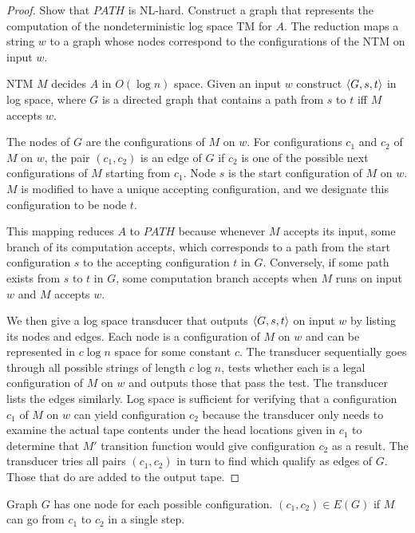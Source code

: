 \begin{mdframed}
\begin{proof}
Show that $PATH$ is NL-hard. Construct a graph that represents the computation of the nondeterministic log space TM for $A$. The reduction maps a string $w$ to a graph whose nodes correspond to the configurations of the NTM on input $w$.

NTM $M$ decides $A$ in $O(\log n)$ space. Given an input $w$ construct $\langle{G, s, t}\rangle$ in log space, where $G$ is a directed graph that contains a path from $s$ to $t$ iff $M$ accepts $w$.

The nodes of $G$ are the configurations of $M$ on $w$. For configurations $c_1$ and $c_2$ of $M$ on $w$, the pair $(c_1, c_2)$ is an edge of $G$ if $c_2$ is one of the possible next configurations of $M$ starting from $c_1$. Node $s$ is the start configuration of $M$ on $w$. $M$ is modified to have a unique accepting configuration, and we designate this configuration to be node $t$.

This mapping reduces $A$ to $PATH$ because whenever $M$ accepts its input, some branch of its computation accepts, which corresponds to a path from the start configuration $s$ to the accepting configuration $t$ in $G$. Conversely, if some path exists from $s$ to $t$ in $G$, some computation branch accepts when $M$ runs on input $w$ and $M$ accepts $w$.

We then give a log space transducer that outputs $\langle{G, s, t}\rangle$ on input $w$ by listing its nodes and edges. Each node is a configuration of $M$ on $w$ and can be represented in $c\log n$ space for some constant $c$. The transducer sequentially goes through all possible strings of length $c\log n$, tests whether each is a legal configuration of $M$ on $w$ and outputs those that pass the test. The transducer lists the edges similarly. Log space is sufficient for verifying that a configuration $c_1$ of $M$ on $w$ can yield configuration $c_2$ because the transducer only needs to examine the actual tape contents under the head locations given in $c_1$ to determine that $M'$ transition function would give configuration $c_2$ as a result. The transducer tries all pairs $(c_1, c_2)$ in turn to find which qualify as edges of $G$. Those that do are added to the output tape.
\end{proof}
\end{mdframed}

Graph $G$ has one node for each possible configuration. $(c_1, c_2) \in E(G)$ if $M$ can go from $c_1$ to $c_2$ in a single step.

